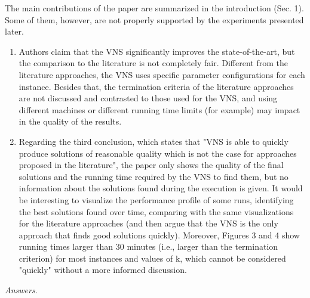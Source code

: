 \documentclass [11pt]{scrartcl}
\begin{document}
\begin{leftbar}
  
The main contributions of the paper are summarized in the introduction (Sec. 1). Some of them, however, are not properly supported by the experiments presented later.
\begin{enumerate}
	\item Authors claim that the VNS significantly improves the state-of-the-art, but the comparison to the literature is not completely fair. Different from the literature approaches, the VNS uses specific parameter configurations for each instance. Besides that, the termination criteria of the literature approaches are not discussed and contrasted to those used for the VNS, and using different machines or different running time limits (for example) may impact in the quality of the results. 
	\item Regarding the third conclusion, which states that "VNS is able to quickly produce solutions of reasonable quality which is not the case for approaches proposed in the literature", the paper only shows the quality of the final solutions and the running time required by the VNS to find them, but no information about the solutions found during the execution is given. It would be interesting to visualize the performance profile of some runs, identifying the best solutions found over time, comparing with the same visualizations for the literature approaches (and then argue that the VNS is the only approach that finds good solutions quickly). Moreover, Figures 3 and 4 show running times larger than 30 minutes (i.e., larger than the termination criterion) for most instances and values of k, which cannot be considered "quickly" without a more informed discussion.
\end{enumerate}
\end{leftbar}

\emph{Answers}. 
\end{document}
